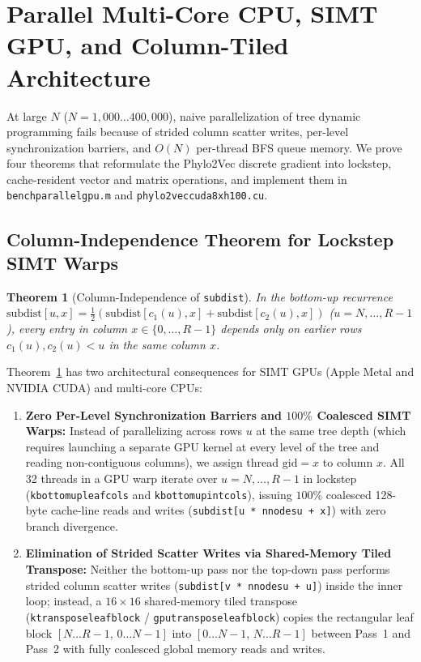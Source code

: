 \documentclass[11pt,a4paper]{article}
\makeatletter
\DeclareRobustCommand{\_}{\ifmmode\nfss@text{\textunderscore}\else\textunderscore\allowbreak\fi}
\newtheorem{theorem}{Theorem}[section]
\theoremstyle{definition}
\makeatother
\begin{document}
\section{Parallel Multi-Core CPU, SIMT GPU, and Column-Tiled Architecture}
\label{sec:parallel}

At large $N$ ($N = 1{,}000 \dots 400{,}000$), naive parallelization of tree dynamic programming fails because of strided column scatter writes, per-level synchronization barriers, and $O(N)$ per-thread BFS queue memory. We prove four theorems that reformulate the Phylo2Vec discrete gradient into lockstep, cache-resident vector and matrix operations, and implement them in \texttt{bench\_parallel\_gpu.m} and \texttt{phylo2vec\_cuda\_8xh100.cu}.

\subsection{Column-Independence Theorem for Lockstep SIMT Warps}

\begin{theorem}[Column-Independence of \texttt{subdist}]
\label{thm:col_indep}
In the bottom-up recurrence $\text{subdist}[u, x] = \frac{1}{2}(\text{subdist}[c_1(u), x] + \text{subdist}[c_2(u), x])$ ($u = N, \dots, R-1$), every entry in column $x \in \{0, \dots, R-1\}$ depends only on earlier rows $c_1(u), c_2(u) < u$ in the same column $x$.
\end{theorem}

Theorem~\ref{thm:col_indep} has two architectural consequences for SIMT GPUs (Apple Metal and NVIDIA CUDA) and multi-core CPUs:
\begin{enumerate}
    \item \textbf{Zero Per-Level Synchronization Barriers and $100\%$ Coalesced SIMT Warps:} Instead of parallelizing across rows $u$ at the same tree depth (which requires launching a separate GPU kernel at every level of the tree and reading non-contiguous columns), we assign thread $\text{gid} = x$ to column $x$. All 32 threads in a GPU warp iterate over $u = N, \dots, R-1$ in lockstep (\texttt{k\_bottom\_up\_leaf\_cols} and \texttt{k\_bottom\_up\_int\_cols}), issuing $100\%$ coalesced 128-byte cache-line reads and writes (\texttt{subdist[u * n\_nodes\_u + x]}) with zero branch divergence.
    \item \textbf{Elimination of Strided Scatter Writes via Shared-Memory Tiled Transpose:} Neither the bottom-up pass nor the top-down pass performs strided column scatter writes (\texttt{subdist[v * n\_nodes\_u + u]}) inside the inner loop; instead, a $16 \times 16$ shared-memory tiled transpose (\texttt{k\_transpose\_leaf\_block} / \texttt{gpu\_transpose\_leaf\_block}) copies the rectangular leaf block $[N \dots R-1, \, 0 \dots N-1]$ into $[0 \dots N-1, \, N \dots R-1]$ between Pass~1 and Pass~2 with fully coalesced global memory reads and writes.
\end{enumerate}
\end{document}
